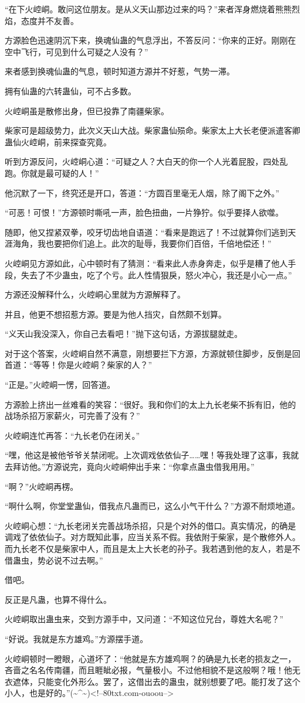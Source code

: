 \begin{this_body}
“在下火崆峒。敢问这位朋友。是从义天山那边过来的吗？”来者浑身燃烧着熊熊烈焰，态度并不友善。

方源脸色迅速阴沉下来，换魂仙蛊的气息浮出，不答反问：“你来的正好。刚刚在空中飞行，可见到什么可疑之人没有？”

来者感到换魂仙蛊的气息，顿时知道方源并不好惹，气势一滞。

拥有仙蛊的六转蛊仙，可不占多数。

火崆峒虽是散修出身，但已投靠了南疆柴家。

柴家可是超级势力，此次义天山大战。柴家蛊仙殒命。柴家太上大长老便派遣客卿蛊仙火崆峒，前来探查究竟。

听到方源反问，火崆峒心道：“可疑之人？大白天的你一个人光着屁股，四处乱跑。你就是最可疑的人！”

他沉默了一下，终究还是开口，答道：“方圆百里毫无人烟，除了阁下之外。”

“可恶！可恨！”方源顿时嘶吼一声，脸色扭曲，一片狰狞。似乎要择人欲噬。

随即，他又捏紧双拳，咬牙切齿地自语道：“看来是跑远了！不过就算你们逃到天涯海角，我也要把你们追上。此次的耻辱，我要你们百倍，千倍地偿还！”

火崆峒见方源如此，心中顿时有了猜测：“看来此人赤身奔走，似乎是糟了他人手段，失去了不少蛊虫，吃了个亏。此人性情狠戾，怒火冲心，我还是小心一点。”

方源还没解释什么，火崆峒心里就为方源解释了。

并且，他更不想招惹方源。要是为他人挡灾，自然颇不划算。

“义天山我没深入，你自己去看吧！”抛下这句话，方源拔腿就走。

对于这个答案，火崆峒自然不满意，刚想要拦下方源，方源就顿住脚步，反倒是回首道：“等等！你是火崆峒？柴家的人？”

“正是。”火崆峒一愣，回答道。

方源脸上挤出一丝难看的笑容：“很好。我和你们的太上九长老柴不拆有旧，他的战场杀招万家薪火，可完善了没有？”

火崆峒连忙再答：“九长老仍在闭关。”

“嘿，他这是被他爷爷关禁闭呢。上次调戏依依仙子……嘿！等我处理了这事，我就去拜访他。”方源说完，竟向火崆峒伸出手来：“你拿点蛊虫借我用用。”

“啊？”火崆峒再楞。

“啊什么啊，你堂堂蛊仙，借我点凡蛊而已，这么小气干什么？”方源不耐烦地道。

火崆峒心想：“九长老闭关完善战场杀招，只是个对外的借口。真实情况，的确是调戏了依依仙子。对方既知此事，应当关系不假。我依附于柴家，是个散修外人。而九长老不仅是柴家中人，而且是太上大长老的孙子。我若遇到他的友人，若是不借蛊虫，势必说不过去啊。”

借吧。

反正是凡蛊，也算不得什么。

火崆峒取出蛊虫来，交到方源手中，又问道：“不知这位兄台，尊姓大名呢？”

“好说。我就是东方雄鸡。”方源摆手道。

火崆峒顿时一瞪眼，心道坏了：“他就是东方雄鸡啊？的确是九长老的损友之一，吝啬之名名传南疆，而且睚眦必报，气量极小。不过他相貌不是这般啊？哦！他无衣遮体，只能变化外形么。罢了，这借出去的蛊虫，就别想要了吧。能打发了这个小人，也是好的。”(\~{}\^{}\~{})<!--80txt.com-ouoou-->

\end{this_body}

